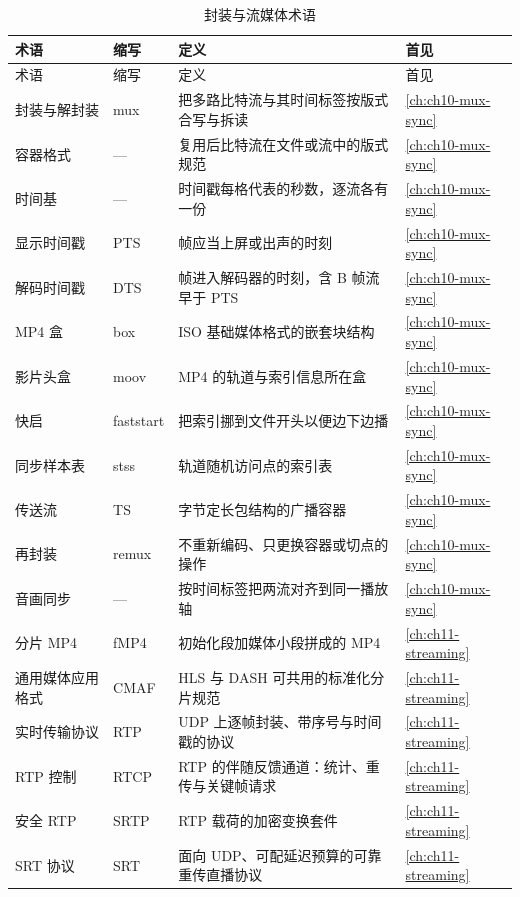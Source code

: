 \documentclass[12pt,a4paper,fontset=fandol]{ctexbook}
\begin{document}
\begin{longtable}{>{\raggedright\arraybackslash}p{} >{\raggedright\arraybackslash}p{} >{\raggedright\arraybackslash}p{} >{\raggedright\arraybackslash}p{}}
\caption{封装与流媒体术语}\label{tab:apa-stream} \\
\toprule
术语 & 缩写 & 定义 & 首见 \\
\midrule
\endfirsthead
\toprule
术语 & 缩写 & 定义 & 首见 \\
\midrule
\endhead
\bottomrule
\endfoot
封装与解封装 & mux & 把多路比特流与其时间标签按版式合写与拆读 & \ref{ch:ch10-mux-sync} \\
容器格式 & — & 复用后比特流在文件或流中的版式规范 & \ref{ch:ch10-mux-sync} \\
时间基 & — & 时间戳每格代表的秒数，逐流各有一份 & \ref{ch:ch10-mux-sync} \\
显示时间戳 & PTS & 帧应当上屏或出声的时刻 & \ref{ch:ch10-mux-sync} \\
解码时间戳 & DTS & 帧进入解码器的时刻，含 B 帧流早于 PTS & \ref{ch:ch10-mux-sync} \\
MP4 盒 & box & ISO 基础媒体格式的嵌套块结构 & \ref{ch:ch10-mux-sync} \\
影片头盒 & moov & MP4 的轨道与索引信息所在盒 & \ref{ch:ch10-mux-sync} \\
快启 & faststart & 把索引挪到文件开头以便边下边播 & \ref{ch:ch10-mux-sync} \\
同步样本表 & stss & 轨道随机访问点的索引表 & \ref{ch:ch10-mux-sync} \\
传送流 & TS & 188 字节定长包结构的广播容器 & \ref{ch:ch10-mux-sync} \\
再封装 & remux & 不重新编码、只更换容器或切点的操作 & \ref{ch:ch10-mux-sync} \\
音画同步 & — & 按时间标签把两流对齐到同一播放轴 & \ref{ch:ch10-mux-sync} \\
分片 MP4 & fMP4 & 初始化段加媒体小段拼成的 MP4 & \ref{ch:ch11-streaming} \\
通用媒体应用格式 & CMAF & HLS 与 DASH 可共用的标准化分片规范 & \ref{ch:ch11-streaming} \\
实时传输协议 & RTP & UDP 上逐帧封装、带序号与时间戳的协议 & \ref{ch:ch11-streaming} \\
RTP 控制 & RTCP & RTP 的伴随反馈通道：统计、重传与关键帧请求 & \ref{ch:ch11-streaming} \\
安全 RTP & SRTP & RTP 载荷的加密变换套件 & \ref{ch:ch11-streaming} \\
SRT 协议 & SRT & 面向 UDP、可配延迟预算的可靠重传直播协议 & \ref{ch:ch11-streaming} \\

\end{longtable}
\end{document}
